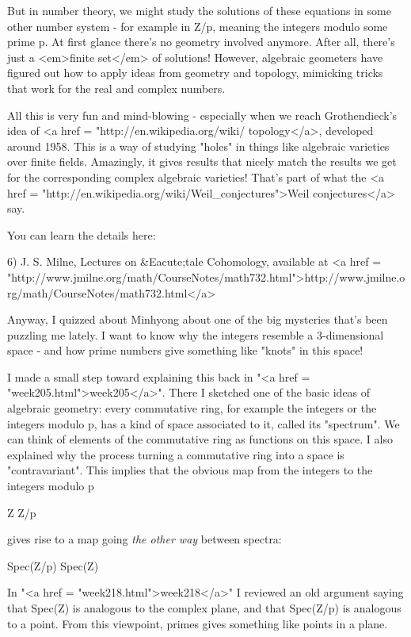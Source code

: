 But in number theory, we might study the solutions of these 
equations in some other number system - for example in Z/p, 
meaning the integers modulo some prime p.  At first glance there's 
no geometry involved anymore.  After all, there's just a <em>finite 
set</em> of solutions!  However, algebraic geometers have figured 
out how to apply ideas from geometry and topology, mimicking 
tricks that work for the real and complex numbers.  

All this is very fun and mind-blowing - especially when we reach
Grothendieck's idea of <a href =
"http://en.wikipedia.org/wiki/%
topology</a>, developed around 1958.  This is a way of studying
"holes" in things like algebraic varieties over finite
fields.  Amazingly, it gives results that nicely match the results we
get for the corresponding complex algebraic varieties!  That's part of
what the <a href =
"http://en.wikipedia.org/wiki/Weil_conjectures">Weil conjectures</a>
say.


You can learn the details here:

6) J. S. Milne, Lectures on &Eacute;tale Cohomology, available at
<a href = "http://www.jmilne.org/math/CourseNotes/math732.html">http://www.jmilne.org/math/CourseNotes/math732.html</a>

Anyway, I quizzed about Minhyong about one of the big mysteries
that's been puzzling me lately.  I want to know why the integers 
resemble a 3-dimensional space - and how prime numbers give something
like "knots" in this space!  

I made a small step toward explaining this back in "<a href =
"week205.html">week205</a>".  There I sketched one of the basic
ideas of algebraic geometry: every commutative ring, for example the
integers or the integers modulo p, has a kind of space associated to
it, called its "spectrum".  We can think of elements of the
commutative ring as functions on this space.  I also explained why the
process turning a commutative ring into a space is "contravariant".
This implies that the obvious map from the integers to the integers
modulo p

Z \to  Z/p

gives rise to a map going \emph{the other way} between spectra:

Spec(Z/p) \to  Spec(Z)

In "<a href = "week218.html">week218</a>" I reviewed an
old argument saying that Spec(Z) is analogous to the complex
plane, and that Spec(Z/p) is analogous to a point.  
From this viewpoint, primes gives something like points in a plane.  

